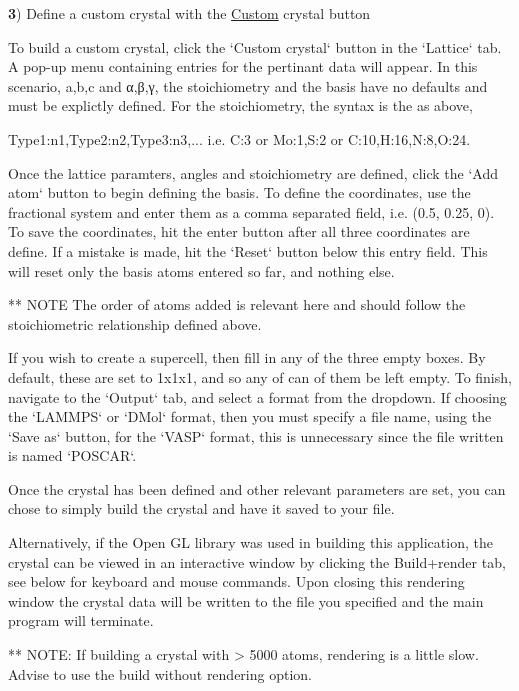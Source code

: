 {\bfseries 3}) Define a custom crystal with the {\ttfamily \hyperlink{class_custom}{Custom} crystal} button \begin{DoxyVerb}    To build a custom crystal, click the `Custom crystal` button in the `Lattice` tab.  A pop-up menu containing
    entries for the pertinant data will appear. In this scenario, a,b,c and  α,β,γ, the stoichiometry and
    the basis have no defaults and must be explictly defined.  For the stoichiometry, the syntax is the as above,

        Type1:n1,Type2:n2,Type3:n3,... i.e.  C:3 or Mo:1,S:2 or  C:10,H:16,N:8,O:24.    

    Once the lattice paramters, angles and stoichiometry are defined, click the `Add atom` button to begin
    defining the basis.  To define the coordinates, use the fractional system and enter them as a comma
    separated field, i.e. (0.5, 0.25, 0).  To save the coordinates, hit the enter button after all three coordinates
    are define.  If a mistake is made, hit the `Reset` button below this entry field.  This will reset only the
    basis atoms entered so far, and nothing else. 

    ** NOTE The order of atoms added is relevant here and should follow the 
            stoichiometric relationship defined above.

    If you wish to create a supercell, then fill in any of the three empty boxes.  By default, these are set 
    to 1x1x1, and so any of can of them be left empty.  To finish, navigate to the `Output` tab, and select 
    a format from the dropdown. If choosing the `LAMMPS` or `DMol` format, then you must specify a file name, 
    using the `Save as` button, for the `VASP` format, this is unnecessary since the file written is named `POSCAR`.
\end{DoxyVerb}


Once the crystal has been defined and other relevant parameters are set, you can chose to simply build the crystal and have it saved to your file.

Alternatively, if the {\ttfamily Open G\+L} library was used in building this application, the crystal can be viewed in an interactive window by clicking the {\ttfamily Build+render} tab, see below for keyboard and mouse commands. Upon closing this rendering window the crystal data will be written to the file you specified and the main program will terminate.

\begin{DoxyVerb}    ** NOTE: If building a crystal with > 5000 atoms, rendering is a little slow.  Advise
             to use the build without rendering option.
\end{DoxyVerb}


